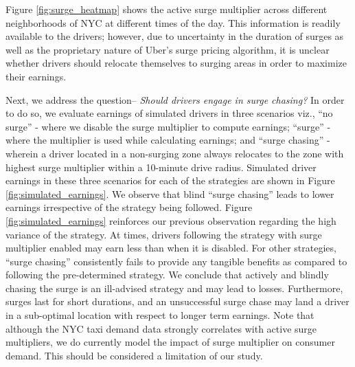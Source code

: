 Figure \ref{fig:surge_heatmap} shows the active surge multiplier across different neighborhoods of NYC at 
different times of the day. 
This information is readily available to the drivers; however, due to uncertainty in the duration of surges 
  as well as the proprietary nature of Uber's surge pricing algorithm, 
  it is unclear whether drivers should relocate themselves to surging areas in order to maximize their earnings.


Next, we address the question-- \textit{Should drivers engage in surge chasing?}
In order to do so, we evaluate earnings of simulated drivers in three scenarios viz., 
``no surge'' - where we disable the surge multiplier to compute earnings; ``surge'' - 
where the multiplier is used while calculating earnings; and ``surge chasing'' -
wherein a driver located in a non-surging zone always relocates to the zone with highest surge multiplier within a 10-minute drive radius. 
Simulated driver earnings in these three scenarios for each of the strategies are shown in Figure {\ref{fig:simulated_earnings}}. 
We observe that blind ``surge chasing'' leads to lower earnings irrespective of the strategy being followed. 
Figure \ref{fig:simulated_earnings} reinforces our previous observation regarding the high variance of the {\naive} strategy. 
At times, drivers following the {\naive} strategy with surge multiplier enabled may earn less than when it is disabled. 
For other strategies, ``surge chasing'' consistently fails to provide any tangible benefits as compared to 
following the pre-determined strategy. We conclude that actively and blindly chasing the surge is an ill-advised 
strategy and may lead to losses. Furthermore, surges last for short durations, and an unsuccessful surge chase 
may land a driver in a sub-optimal location with respect to longer term earnings. 
Note that although the NYC taxi demand data strongly 
correlates with active surge multipliers, we do 
currently model the impact of surge multiplier on consumer demand. This should be considered a limitation of our study.

